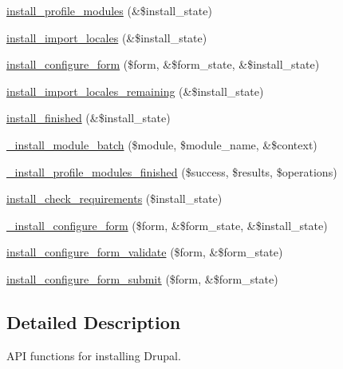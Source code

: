 \begin{DoxyCompactItemize}
\item 
\hyperlink{install_8core_8inc_ab10e46f9de8a36a5f53c209781d24528}{install\_\-profile\_\-modules} (\&\$install\_\-state)
\item 
\hyperlink{install_8core_8inc_a8736de2cc75cff24bc4b070668526dde}{install\_\-import\_\-locales} (\&\$install\_\-state)
\item 
\hyperlink{group__forms_ga38e5d79d667dbc48f40ca4238d6d161b}{install\_\-configure\_\-form} (\$form, \&\$form\_\-state, \&\$install\_\-state)
\item 
\hyperlink{install_8core_8inc_a6a48bc00f0f8e3026dd09286f93b46aa}{install\_\-import\_\-locales\_\-remaining} (\&\$install\_\-state)
\item 
\hyperlink{install_8core_8inc_abd023c5f3e8348d02d2667ed5648a0fb}{install\_\-finished} (\&\$install\_\-state)
\item 
\hyperlink{install_8core_8inc_aa0dfff943ef80d5bfad2f0be5c4cff19}{\_\-install\_\-module\_\-batch} (\$module, \$module\_\-name, \&\$context)
\item 
\hyperlink{install_8core_8inc_aa345da0dac456ba24a1551a9ce3ce4dc}{\_\-install\_\-profile\_\-modules\_\-finished} (\$success, \$results, \$operations)
\item 
\hyperlink{install_8core_8inc_ae9175b59627ec291ef76fd241f74f33e}{install\_\-check\_\-requirements} (\$install\_\-state)
\item 
\hyperlink{group__forms_ga21b381d33cf055bce4286d99dafad24b}{\_\-install\_\-configure\_\-form} (\$form, \&\$form\_\-state, \&\$install\_\-state)
\item 
\hyperlink{install_8core_8inc_a6b3794048999c91eed0b6a7633a8e8f3}{install\_\-configure\_\-form\_\-validate} (\$form, \&\$form\_\-state)
\item 
\hyperlink{install_8core_8inc_ac4774b453669916d9ffbb619b4bf9717}{install\_\-configure\_\-form\_\-submit} (\$form, \&\$form\_\-state)
\end{DoxyCompactItemize}


\subsection{Detailed Description}
API functions for installing Drupal. 


